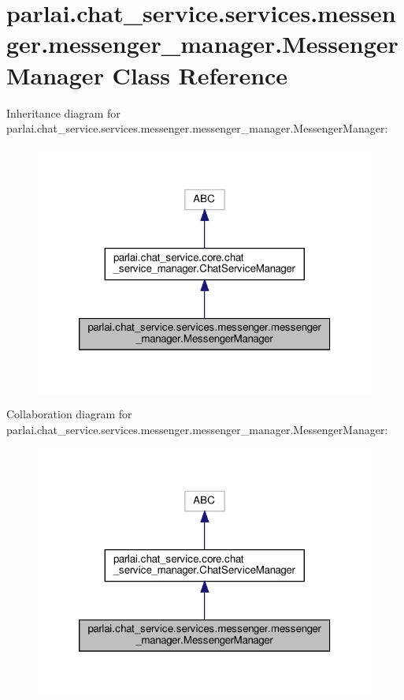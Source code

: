 \hypertarget{classparlai_1_1chat__service_1_1services_1_1messenger_1_1messenger__manager_1_1MessengerManager}{}\section{parlai.\+chat\+\_\+service.\+services.\+messenger.\+messenger\+\_\+manager.\+Messenger\+Manager Class Reference}
\label{classparlai_1_1chat__service_1_1services_1_1messenger_1_1messenger__manager_1_1MessengerManager}


Inheritance diagram for parlai.\+chat\+\_\+service.\+services.\+messenger.\+messenger\+\_\+manager.\+Messenger\+Manager\+:
\nopagebreak
\begin{figure}[H]
\begin{center}
\leavevmode
\includegraphics[width=320pt]{d3/dfb/classparlai_1_1chat__service_1_1services_1_1messenger_1_1messenger__manager_1_1MessengerManager__inherit__graph}
\end{center}
\end{figure}


Collaboration diagram for parlai.\+chat\+\_\+service.\+services.\+messenger.\+messenger\+\_\+manager.\+Messenger\+Manager\+:
\nopagebreak
\begin{figure}[H]
\begin{center}
\leavevmode
\includegraphics[width=320pt]{d0/d0c/classparlai_1_1chat__service_1_1services_1_1messenger_1_1messenger__manager_1_1MessengerManager__coll__graph}
\end{center}
\end{figure}

